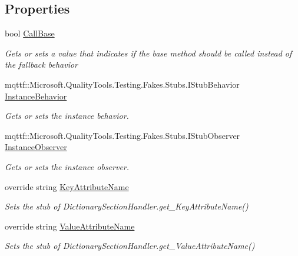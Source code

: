 \subsection*{Properties}
\begin{DoxyCompactItemize}
\item 
bool \hyperlink{class_system_1_1_configuration_1_1_fakes_1_1_stub_dictionary_section_handler_ab42df553c7b23c284595ff75441c9b38}{Call\-Base}
\begin{DoxyCompactList}\small\item\em Gets or sets a value that indicates if the base method should be called instead of the fallback behavior\end{DoxyCompactList}\item 
mqttf\-::\-Microsoft.\-Quality\-Tools.\-Testing.\-Fakes.\-Stubs.\-I\-Stub\-Behavior \hyperlink{class_system_1_1_configuration_1_1_fakes_1_1_stub_dictionary_section_handler_acfafa49ebbb70205429f41f75683efe2}{Instance\-Behavior}
\begin{DoxyCompactList}\small\item\em Gets or sets the instance behavior.\end{DoxyCompactList}\item 
mqttf\-::\-Microsoft.\-Quality\-Tools.\-Testing.\-Fakes.\-Stubs.\-I\-Stub\-Observer \hyperlink{class_system_1_1_configuration_1_1_fakes_1_1_stub_dictionary_section_handler_a08e95477d2b783e4c26abf07631d270d}{Instance\-Observer}
\begin{DoxyCompactList}\small\item\em Gets or sets the instance observer.\end{DoxyCompactList}\item 
override string \hyperlink{class_system_1_1_configuration_1_1_fakes_1_1_stub_dictionary_section_handler_a5a19e2772067e8ed1f0697edf2a97b9f}{Key\-Attribute\-Name}
\begin{DoxyCompactList}\small\item\em Sets the stub of Dictionary\-Section\-Handler.\-get\-\_\-\-Key\-Attribute\-Name()\end{DoxyCompactList}\item 
override string \hyperlink{class_system_1_1_configuration_1_1_fakes_1_1_stub_dictionary_section_handler_a514aaa985f34188afee5754aa0bde071}{Value\-Attribute\-Name}
\begin{DoxyCompactList}\small\item\em Sets the stub of Dictionary\-Section\-Handler.\-get\-\_\-\-Value\-Attribute\-Name()\end{DoxyCompactList}\end{DoxyCompactItemize}


